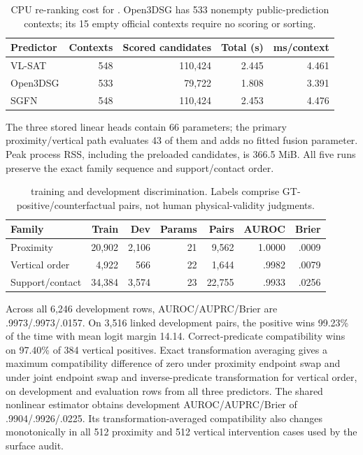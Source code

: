 \begin{table}[t]
\centering
{\small
\setlength{\tabcolsep}{3pt}
\begin{tabular}{lrrrr}
\toprule
Predictor & Contexts & Scored candidates & Total (s) & ms/context \\
\midrule
VL-SAT & 548 & 110,424 & 2.445 & 4.461 \\
Open3DSG & 533 & 79,722 & 1.808 & 3.391 \\
SGFN & 548 & 110,424 & 2.453 & 4.476 \\
\bottomrule
\end{tabular}
}
\caption{CPU re-ranking cost for \methodlinear{}. Open3DSG has 533 nonempty public-prediction
contexts; its 15 empty official contexts require no scoring or sorting.}
\label{tab:runtime}
\end{table}

The three stored linear heads contain 66 parameters; the primary proximity/vertical
path evaluates 43 of them and adds no fitted fusion parameter. Peak process RSS,
including the preloaded candidates, is 366.5 MiB. All five runs preserve the exact
family sequence and support/contact order.

\begin{table}[t]
\centering
{\small
\setlength{\tabcolsep}{2pt}
\begin{tabular}{@{}lrrrrrr@{}}
\toprule
Family & Train & Dev & Params & Pairs & AUROC & Brier \\
\midrule
Proximity & 20,902 & 2,106 & 21 & 9,562 & 1.0000 & .0009 \\
Vertical order & 4,922 & 566 & 22 & 1,644 & .9982 & .0079 \\
Support/contact & 34,384 & 3,574 & 23 & 22,755 & .9933 & .0256 \\
\bottomrule
\end{tabular}
}
\caption{\methodlinear{} training and development discrimination. Labels comprise
GT-positive/counterfactual pairs, not human physical-validity judgments.}
\label{tab:family-discrimination}
\end{table}

Across all 6,246 development rows, AUROC/AUPRC/Brier are
.9973/.9973/.0157. On 3,516 linked development pairs, the positive wins 99.23\%
of the time with mean logit margin 14.14. Correct-predicate compatibility wins
on 97.40\% of 384 vertical positives. Exact transformation averaging gives a
maximum compatibility difference of zero under proximity endpoint swap and
under joint endpoint swap and inverse-predicate transformation for vertical
order, on development and evaluation rows from all three predictors.
The shared nonlinear estimator obtains development
AUROC/AUPRC/Brier of .9904/.9926/.0225. Its transformation-averaged
compatibility also changes monotonically in all 512 proximity and 512 vertical
intervention cases used by the surface audit.


